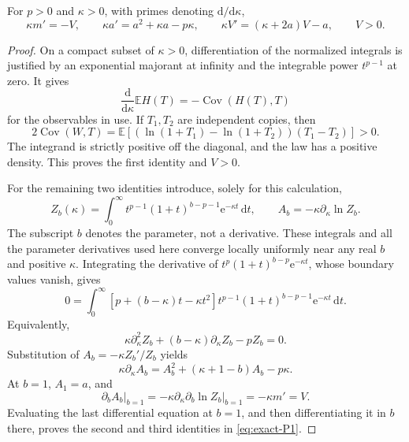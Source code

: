 \begin{proposition}\label{prop:exact-P1} For $p>0$ and $\kappa>0$, with primes denoting \(\mathrm{d}/\mathrm{d}\kappa\),
\begin{equation}
 \kappa m'=-V,\qquad
 \kappa a'=a^2+\kappa a-p\kappa,\qquad
 \kappa V'=(\kappa+2a)V-a,\qquad V>0.                 \label{eq:exact-P1}
\end{equation}

\end{proposition}
\begin{proof} On a compact subset of \(\kappa>0\), differentiation of the normalized integrals is justified by an exponential majorant at infinity and the integrable power \(t^{p-1}\) at zero. It gives
\begin{equation}
 \frac{\mathrm{d}}{\mathrm{d}\kappa}\mathbb{E} H(T)=-\operatorname{Cov}(H(T),T)
\end{equation}
for the observables in use. If \(T_1,T_2\) are independent copies, then
\begin{equation}
 2\operatorname{Cov}(W,T)
 =\mathbb{E}[(\ln(1+T_1)-\ln(1+T_2))(T_1-T_2)]>0.
\end{equation}
The integrand is strictly positive off the diagonal, and the law has a positive density. This proves the first identity and \(V>0\).

For the remaining two identities introduce, solely for this calculation,
\begin{equation}
 Z_b(\kappa)=\int_0^\infty
 t^{p-1}(1+t)^{b-p-1}\mathrm{e}^{-\kappa t}\,\mathrm{d}t,
 \qquad A_b=-\kappa\partial_\kappa\ln Z_b.
\end{equation}
The subscript \(b\) denotes the parameter, not a derivative. These integrals and all the parameter derivatives used here converge locally uniformly near any real \(b\) and positive \(\kappa\). Integrating the derivative of
\(t^p(1+t)^{b-p}\mathrm{e}^{-\kappa t}\), whose boundary values vanish, gives
\begin{equation}
 0=\int_0^\infty [p+(b-\kappa)t-\kappa t^2]
 t^{p-1}(1+t)^{b-p-1}\mathrm{e}^{-\kappa t}\,\mathrm{d}t.
\end{equation}
Equivalently,
\begin{equation}
 \kappa\partial_\kappa^2Z_b+(b-\kappa)\partial_\kappa Z_b-pZ_b=0.
\end{equation}
Substitution of \(A_b=-\kappa Z_b'/Z_b\) yields
\begin{equation}
 \kappa\partial_\kappa A_b=A_b^2+(\kappa+1-b)A_b-p\kappa.
\end{equation}
At \(b=1\), \(A_1=a\), and
\begin{equation}
 \left.\partial_b A_b\right|_{b=1}
 =-\kappa\partial_\kappa
   \left.\partial_b\ln Z_b\right|_{b=1}
 =-\kappa m'=V.
\end{equation}
Evaluating the last differential equation at \(b=1\), and then differentiating it in \(b\) there, proves the second and third identities in \eqref{eq:exact-P1}. \end{proof}

